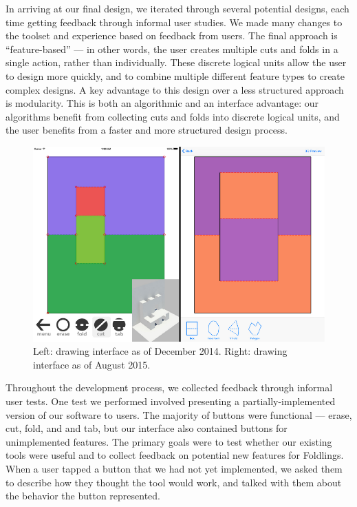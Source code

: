 In arriving at our final design, we iterated through several potential
designs, each time getting feedback through informal user studies. We
made many changes to the toolset and experience based on feedback from
users. The final approach is ``feature-based'' --- in other words, the
user creates multiple cuts and folds in a single action, rather than
individually. These discrete logical units allow the user to design more
quickly, and to combine multiple different feature types to create
complex designs. A key advantage to this design over a less structured
approach is modularity. This is both an algorithmic and an interface
advantage: our algorithms benefit from collecting cuts and folds into
discrete logical units, and the user benefits from a faster and more
structured design process.

\begin{figure}[htbp]
\centering
\includegraphics{figures/31_UI_Interface_Iteration/beforeafterinface.pdf}
\caption{Left: drawing interface as of December 2014. Right: drawing
interface as of August 2015.}
\end{figure}

Throughout the development process, we collected feedback through
informal user tests. One test we performed involved presenting a
partially-implemented version of our software to users. The majority of
buttons were functional --- erase, cut, fold, and and tab, but our
interface also contained buttons for unimplemented features. The primary
goals were to test whether our existing tools were useful and to collect
feedback on potential new features for Foldlings. When a user tapped a
button that we had not yet implemented, we asked them to describe how
they thought the tool would work, and talked with them about the
behavior the button represented.

